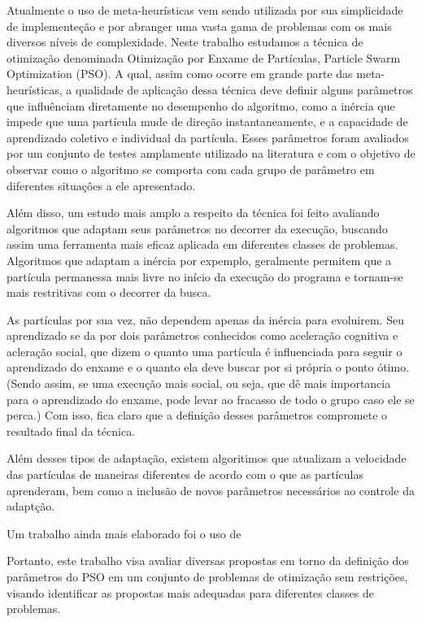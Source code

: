 \begin{resumo}
	Atualmente o uso de meta-heur\'isticas
	vem sendo utilizada por sua simplicidade de implemente\c c\~ao e por abranger uma vasta 
	gama de problemas com os mais diversos n\'iveis de complexidade. 
	Neste trabalho estudamos a t\'ecnica de otimiza\c c\~ao denominada Otimiza\c c\~ao por 
	Enxame de Part\'iculas, Particle Swarm Optimization (PSO). 
	A qual, assim como ocorre em grande parte das meta-heur\'isticas, a qualidade 
	de aplica\c c\~ao dessa t\'ecnica deve definir alguns par\^ametros que influ\^enciam 
	diretamente no desempenho do algoritmo, como a in\'ercia que impede que uma 
	part\'icula mude de dire\c c\~ao instantaneamente, e a capacidade de aprendizado 
	coletivo e individual da part\'icula. Esses par\^ametros foram avaliados por um 
	conjunto de testes amplamente utilizado na literatura e com o objetivo de 
	observar como o algoritmo se comporta com cada grupo de par\^ametro em diferentes 
	situa\c c\^oes a ele apresentado. 
	
	Al\'em disso, um estudo mais amplo a respeito da t\'ecnica foi feito avaliando 
	algoritmos que adaptam seus par\^ametros no decorrer da execu\c c\~ao, buscando 
	assim uma ferramenta mais eficaz aplicada em diferentes classes de problemas. 
	Algoritmos que adaptam a in\'ercia por expemplo, geralmente permitem que a 
	part\'icula permanessa mais livre no in\'icio da execu\c c\~ao do programa e tornam-se 
	mais restritivas com o decorrer da busca. 
	
	As part\'iculas por sua vez, n\~ao dependem apenas da in\'ercia para evoluirem. Seu
	aprendizado se da por dois par\^ametros conhecidos como acelera\c c\~ao cognitiva e 
	aclera\c c\~ao social, que dizem o quanto uma part\'icula \'e influenciada para seguir o 
	aprendizado do enxame e o quanto ela deve buscar por si pr\'opria o ponto \'otimo.
	(Sendo assim, se uma execu\c c\~ao mais social, ou seja, que d\^e mais importancia para
	o aprendizado do enxame, pode levar ao fracasso de todo o grupo caso ele se perca.)
	Com isso, fica claro que a defini\c c\~ao desses par\^ametros compromete o resultado final da t\'ecnica.
	
	Al\'em desses tipos de adapta\c c\~ao, existem algoritimos que atualizam a 
	velocidade das part\'iculas de maneiras diferentes de acordo com o que as 
	part\'iculas aprenderam, bem como a inclus\~ao de novos par\^ametros necess\'arios 
	ao controle da adapt\c c\~ao.
	
	Um trabalho ainda mais elaborado foi o uso de 
	
	Portanto, este trabalho visa avaliar diversas propostas em torno da defini\c c\~ao 
	dos par\^ametros do PSO em um conjunto de problemas de otimiza\c c\~ao sem restri\c c\~oes, 
	visando identificar as propostas mais adequadas para diferentes classes de problemas.
\end{resumo}